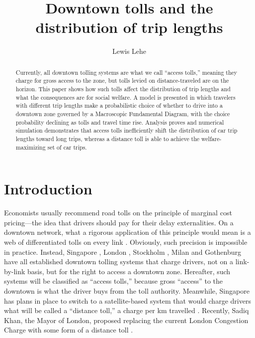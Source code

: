\documentclass[preprint,authoryear]{elsarticle}
\begin{document}
\title{Downtown tolls and the distribution of trip lengths }

\author[ll]{Lewis Lehe }

\address[ll]{Lecturer, UC Berkeley Department of Civil Engineering \\ lewis500@berkeley.edu \\ http://lewislehe.com}

\begin{abstract}

Currently, all downtown tolling systems are what we call ``access tolls,'' meaning they charge for gross access to the zone, but tolls levied on distance-traveled are on the horizon. This paper shows how such tolls affect the distribution of trip lengths and what the consequences are for social welfare. A model is presented in which travelers with different trip lengths make a probabilistic choice of whether to drive into a downtown zone governed by a Macroscopic Fundamental Diagram, with the choice probability declining as tolls and travel time rise. Analysis proves and numerical simulation demonstrates that access tolls inefficiently shift the distribution of car trip lengths toward long trips, whereas a distance toll is able to achieve the welfare-maximizing set of car trips.

\end{abstract}
\maketitle

\section{Introduction}

Economists usually recommend road tolls on the principle of marginal cost pricing---the idea that drivers should pay for their delay externalities. On a downtown network, what a rigorous application of this principle would mean is a web of differentiated tolls on every link \citep{Beckmann1956,YangHuang1998}. Obviously, such precision is impossible in practice. Instead,  Singapore \citep{Santos2004}, London \citep{santos2008,Leape2006}, Stockholm \citep{Eliasson2014}, Milan \citep{Gibson2015} and Gothenburg \citep{Borjesson2015} have all established downtown tolling systems that charge drivers, not on a link-by-link basis, but for the right to access a downtown zone. Hereafter, such systems will be classified as ``access tolls,'' because gross ``access'' to the downtown is what the driver buys from the toll authority. Meanwhile, Singapore has plans in place to switch to a satellite-based system that would charge drivers what will be called a ``distance toll,'' a charge per km travelled \citep{Tan2016}. Recently, Sadiq Khan, the Mayor of London, proposed replacing the current London Congestion Charge with some form of a distance toll \citep{Topham2017}.
\end{document}
